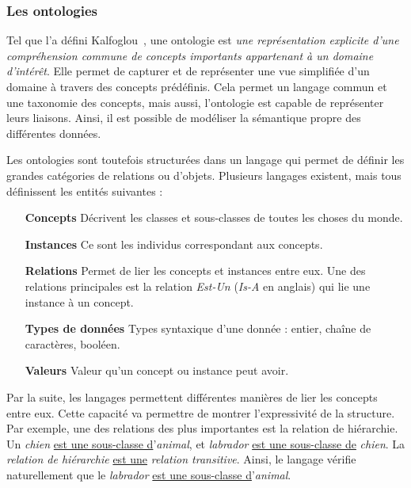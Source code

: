 \subsubsection{Les ontologies}
Tel que l'a défini Kalfoglou~\cite{Kalfoglou:ontology}, une ontologie est \textit{une représentation explicite d'une compréhension commune de concepts importants appartenant à un domaine d'intérêt}.
Elle permet de capturer et de représenter une vue simplifiée d'un domaine à travers des concepts prédéfinis. Cela permet un langage commun et une taxonomie des concepts, mais aussi, l'ontologie est capable de représenter leurs liaisons. Ainsi, il est possible de modéliser la sémantique propre des différentes données.

Les ontologies sont toutefois structurées dans un langage qui permet de définir les grandes catégories de relations ou d'objets. Plusieurs langages existent, mais tous définissent les entités suivantes :
\begin{itemize}
    \item[\textbf{Concepts}] Décrivent les classes et sous-classes de toutes les choses du monde.
    \item[\textbf{Instances}] Ce sont les individus correspondant aux concepts.
    \item[\textbf{Relations}] Permet de lier les concepts et instances entre eux. Une des relations principales est la relation \textit{Est-Un} (\textit{Is-A} en anglais) qui lie une instance à un concept.
    \item[\textbf{Types de données}] Types syntaxique d'une donnée : entier, chaîne de caractères, booléen.
    \item[\textbf{Valeurs}] Valeur qu'un concept ou instance peut avoir.
\end{itemize}

Par la suite, les langages permettent différentes manières de lier les concepts entre eux. Cette capacité va permettre de montrer l'expressivité de la structure. Par exemple, une des relations des plus importantes est la relation de hiérarchie. Un \textit{chien} \underline{est une sous-classe d}'\textit{animal}, et \textit{labrador} \underline{est une sous-classe de} \textit{chien}. La \textit{relation de hiérarchie} \underline{est une} \textit{relation transitive}. Ainsi, le langage vérifie naturellement que le \textit{labrador} \underline{est une sous-classe d}'\textit{animal}. 

